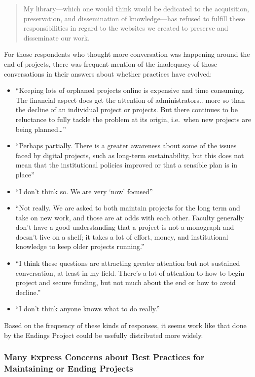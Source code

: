 \documentclass[final]{anthology-ch}
\begin{document}
\begin{quote}
My library---which one would think would be dedicated to the acquisition, preservation, and dissemination of knowledge---has refused to fulfill these responsibilities in regard to the websites we created to preserve and disseminate our work.
\end{quote}

For those respondents who thought more conversation was happening around the end of projects, there was frequent mention of the inadequacy of those conversations in their answers about whether practices have evolved:

\begin{itemize}
  \item \enquote{Keeping lots of orphaned projects online is expensive and time consuming. The financial aspect does get the attention of administrators.. more so than the decline of an individual project or projects. But there continues to be reluctance to fully tackle the problem at its origin, i.e.\ when new projects are being planned\ldots}
  \item \enquote{Perhaps partially. There is a greater awareness about some of the issues faced by digital projects, such as long-term sustainability, but this does not mean that the institutional policies improved or that a sensible plan is in place}
  \item \enquote{I don't think so. We are very \enquote{now} focused}
  \item \enquote{Not really. We are asked to both maintain projects for the long term and take on new work, and those are at odds with each other. Faculty generally don't have a good understanding that a project is not a monograph and doesn't live on a shelf; it takes a lot of effort, money, and institutional knowledge to keep older projects running.}
  \item \enquote{I think these questions are attracting greater attention but not sustained conversation, at least in my field. There's a lot of attention to how to begin project and secure funding, but not much about the end or how to avoid decline.}
  \item \enquote{I don't think anyone knows what to do really.}
\end{itemize}

Based on the frequency of these kinds of responses, it seems work like that done by the Endings Project \cite{endings2024principles} could be usefully distributed more widely.

\subsubsection{Many Express Concerns about Best Practices for Maintaining or Ending Projects}
\end{document}
